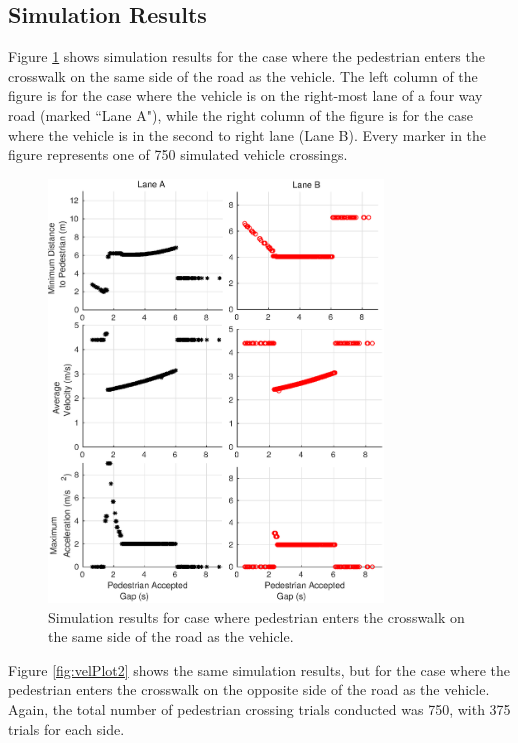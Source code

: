 \documentclass[letterpaper, 10 pt, conference]{ieeeconf}  %
\begin{document}
\subsection{Simulation Results}

Figure \ref{fig:velPlot1} shows simulation results for the case where the pedestrian enters the crosswalk on the same side of the road as the vehicle. The left column of the figure is for the case where the vehicle is on the right-most lane of a four way road (marked ``Lane A"), while the right column of the figure is for the case where the vehicle is in the second to right lane (Lane B). Every marker in the figure represents one of 750 simulated vehicle crossings.

\begin{figure}
\centering
\includegraphics[width=3.5in]{figures/velPlot.eps}
\caption{Simulation results for case where pedestrian enters the crosswalk on the same side of the road as the vehicle.}
\label{fig:velPlot1}
\end{figure}

Figure \ref{fig:velPlot2} shows the same simulation results, but for the case where the pedestrian enters the crosswalk on the opposite side of the road as the vehicle. Again, the total number of pedestrian crossing trials conducted was 750, with 375 trials for each side.  
\end{document}
